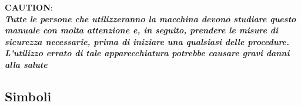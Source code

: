 \documentclass[a4paper]{article}
\begin{document}
\noindent \faExclamationTriangle \textbf{CAUTION}:
\\
\textbf{\textit{Tutte le persone che utilizzeranno la macchina devono studiare questo manuale con molta attenzione e, in seguito, prendere le misure di sicurezza necessarie, prima di iniziare una qualsiasi delle procedure. L'utilizzo errato di tale apparecchiatura potrebbe causare gravi danni alla salute}}

\subsection{Simboli}



\end{document}
